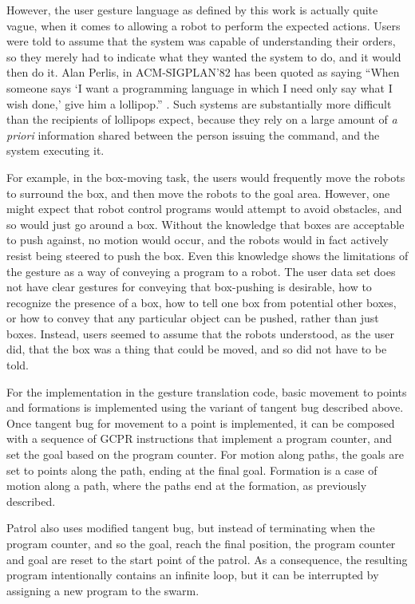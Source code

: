 However, the user gesture language as defined by this work is actually quite vague, when it comes to allowing a robot to perform the expected actions. 
Users were told to assume that the system was capable of understanding their orders, so they merely had to indicate what they wanted the system to do, and it would then do it. 
Alan Perlis, in ACM-SIGPLAN'82 has been quoted as saying ``When someone says `I want a programming language in which I need only say what I wish done,' give him a lollipop.'' \citep{PerlisYaleLolz}.  
Such systems are substantially more difficult than the recipients of lollipops expect, because they rely on a large amount of \emph{a priori} information shared between the person issuing the command, and the system executing it. 

For example, in the box-moving task, the users would frequently move the robots to surround the box, and then move the robots to the goal area. 
However, one might expect that robot control programs would attempt to avoid obstacles, and so would just go around a box. 
Without the knowledge that boxes are acceptable to push against, no motion would occur, and the robots would in fact actively resist being steered to push the box. 
Even this knowledge shows the limitations of the gesture as a way of conveying a program to a robot.
The user data set does not have clear gestures for conveying that box-pushing is desirable, how to recognize the presence of a box, how to tell one box from potential other boxes, or how to convey that any particular object can be pushed, rather than just boxes. 
Instead, users seemed to assume that the robots understood, as the user did, that the box was a thing that could be moved, and so did not have to be told. 

For the implementation in the gesture translation code, basic movement to points and formations is implemented using the variant of tangent bug described above. 
Once tangent bug for movement to a point is implemented, it can be composed with a sequence of GCPR instructions that implement a program counter, and set the goal based on the program counter. 
For motion along paths, the goals are set to points along the path, ending at the final goal. 
Formation is a case of motion along a path, where the paths end at the formation, as previously described. 

Patrol also uses modified tangent bug, but instead of terminating when the program counter, and so the goal, reach the final position, the program counter and goal are reset to the start point of the patrol.  
As a consequence, the resulting program intentionally contains an infinite loop, but it can be interrupted by assigning a new program to the swarm. 

